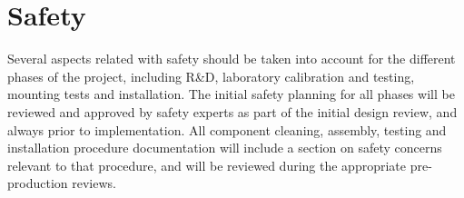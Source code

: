 \section{Safety}
\label{sec:fdgen-slow-cryo-safety}


Several aspects related with safety should be taken into account for the different phases of the  project, including R\&D, laboratory calibration and testing, mounting tests and installation. 
The initial safety planning for all phases will be reviewed and approved by safety experts as part of the initial design review, and always prior to implementation. 
All component cleaning, assembly, testing  and installation procedure documentation will include a section on safety concerns
relevant to that procedure, and will be reviewed during the appropriate pre-production reviews.


